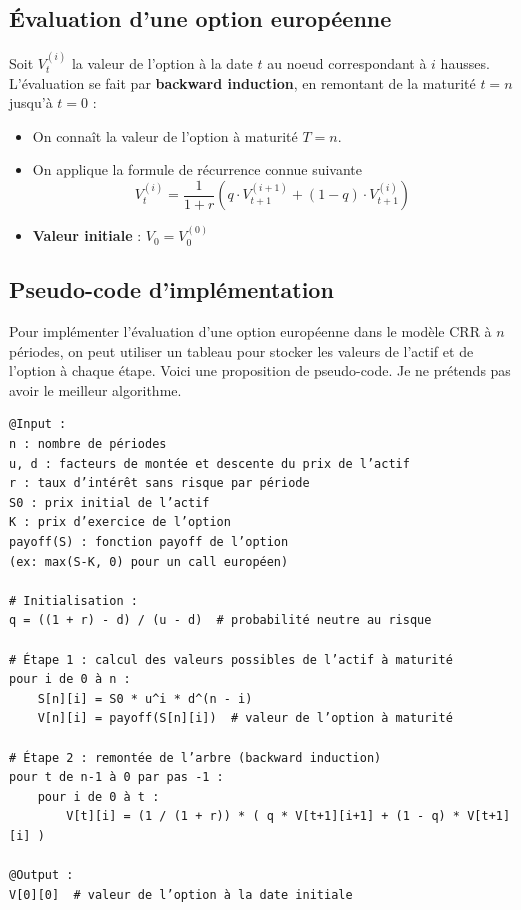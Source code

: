 \documentclass[12pt,a4paper]{article}
\begin{document}
\subsection{Évaluation d'une option européenne}
Soit $V_t^{(i)}$ la valeur de l'option à la date $t$ au noeud correspondant à $i$ hausses.
L'évaluation se fait par \textbf{backward induction}, en remontant de la maturité $t = n$ jusqu'à $t = 0$ :

\begin{itemize}
  \item On connaît la valeur de l'option à maturité $T = n$.
  \item On applique la formule de récurrence connue suivante
  \[
    V_t^{(i)} = \frac{1}{1 + r} \left( q \cdot V_{t+1}^{(i+1)} + (1 - q) \cdot V_{t+1}^{(i)} \right)
  \]
  \item \textbf{Valeur initiale} : $V_0 = V_0^{(0)}$
\end{itemize}

\subsection{Pseudo-code d'implémentation}
Pour implémenter l'évaluation d'une option européenne dans le modèle CRR à $n$ périodes, on peut utiliser un tableau pour stocker les valeurs de l'actif et de l'option à chaque étape. Voici une proposition de pseudo-code. Je ne prétends pas avoir le meilleur algorithme.
\begingroup\small
\begin{verbatim}
@Input :
n : nombre de périodes
u, d : facteurs de montée et descente du prix de l’actif
r : taux d’intérêt sans risque par période
S0 : prix initial de l’actif
K : prix d’exercice de l’option
payoff(S) : fonction payoff de l’option
(ex: max(S-K, 0) pour un call européen)

# Initialisation :
q = ((1 + r) - d) / (u - d)  # probabilité neutre au risque

# Étape 1 : calcul des valeurs possibles de l’actif à maturité
pour i de 0 à n :
    S[n][i] = S0 * u^i * d^(n - i)
    V[n][i] = payoff(S[n][i])  # valeur de l’option à maturité

# Étape 2 : remontée de l’arbre (backward induction)
pour t de n-1 à 0 par pas -1 :
    pour i de 0 à t :
        V[t][i] = (1 / (1 + r)) * ( q * V[t+1][i+1] + (1 - q) * V[t+1][i] )

@Output :
V[0][0]  # valeur de l’option à la date initiale
\end{verbatim}
\endgroup
\end{document}

